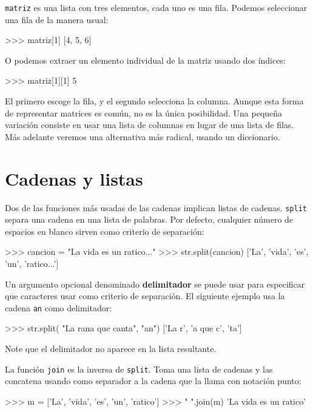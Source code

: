 \texttt{matriz} es una lista con tres elementos, cada uno es una fila.
Podemos seleccionar una fila de la manera usual:
\begin{pyconcode}
>>> matriz[1]
[4, 5, 6]
\end{pyconcode}

O podemos extraer un elemento individual de la matriz usando dos índices:
\begin{pyconcode}
>>> matriz[1][1]
5
\end{pyconcode}

El primero escoge la fila, y el segundo selecciona la columna. Aunque
esta forma de representar matrices es común, no es la única posibilidad.
Una pequeña variación consiste en usar una lista de columnas en lugar
de una lista de filas. Más adelante veremos una alternativa más radical,
usando un diccionario.

  

\section{Cadenas y listas}

 

Dos de las funciones más usadas de las cadenas implican listas de
cadenas. \texttt{split} separa una cadena en una lista de palabras.
Por defecto, cualquier número de espacios en blanco sirven como criterio
de separación:
\begin{pyconcode}
>>> cancion = "La vida es un ratico..."
>>> str.split(cancion)
['La', 'vida', 'es', 'un', 'ratico...']
\end{pyconcode}
Un argumento opcional denominado \textbf{delimitador} se puede usar
para especificar que caracteres usar como criterio de separación.
El siguiente ejemplo usa la cadena \texttt{an} como delimitador:
\begin{pyconcode}
>>> str.split( "La rana que canta", "an")
['La r', 'a que c', 'ta']
\end{pyconcode}

Note que el delimitador no aparece en la lista resultante.

La función \texttt{join} es la inversa de \texttt{split}. Toma una
lista de cadenas y las concatena usando como separador a la cadena
que la llama con notación punto:
\begin{pyconcode}
>>> m = ['La', 'vida', 'es', 'un', 'ratico']
>>> " ".join(m)
'La vida es un ratico'
\end{pyconcode}

